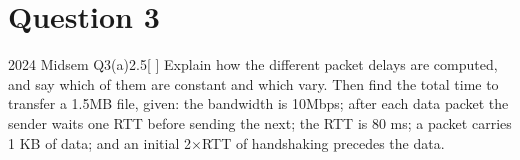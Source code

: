 \section{Question 3}

\begin{question}{2024 Midsem Q3(a)}{2.5}[ ]
Explain how the different packet delays are computed, and say which of them are constant and which vary. Then find the total time to transfer a 1.5MB file, given: the bandwidth is 10Mbps; after each data packet the sender waits one RTT before sending the next; the RTT is 80 ms; a packet carries 1 KB of data; and an initial 2$\times$RTT of handshaking precedes the data.
\end{question}
\label{q:MS2024-3a}
